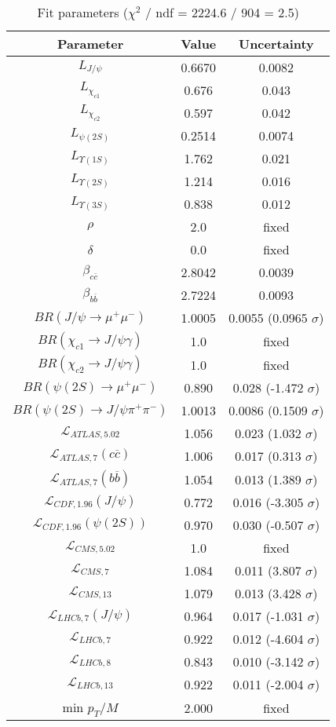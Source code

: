 \begin{table}[h!]
\centering
\begin{tabular}{c|c|c}
Parameter & Value & Uncertainty \\
\hline
$L_{J/\psi}$ & 0.6670 & 0.0082 \\
$L_{\chi_{c1}}$ & 0.676 & 0.043 \\
$L_{\chi_{c2}}$ & 0.597 & 0.042 \\
$L_{\psi(2S)}$ & 0.2514 & 0.0074 \\
$L_{\Upsilon(1S)}$ & 1.762 & 0.021 \\
$L_{\Upsilon(2S)}$ & 1.214 & 0.016 \\
$L_{\Upsilon(3S)}$ & 0.838 & 0.012 \\
$\rho$ & 2.0 & fixed \\
$\delta$ & 0.0 & fixed \\
$\beta_{c\overline c}$ & 2.8042 & 0.0039 \\
$\beta_{b\overline b}$ & 2.7224 & 0.0093 \\
$BR(J/\psi\rightarrow\mu^+\mu^-)$ & 1.0005 & 0.0055 (0.0965 $\sigma$) \\
$BR(\chi_{c1}\rightarrow J/\psi\gamma)$ & 1.0 & fixed \\
$BR(\chi_{c2}\rightarrow J/\psi\gamma)$ & 1.0 & fixed \\
$BR(\psi(2S)\rightarrow\mu^+\mu^-)$ & 0.890 & 0.028 (-1.472 $\sigma$) \\
$BR(\psi(2S)\rightarrow J/\psi\pi^+\pi^-)$ & 1.0013 & 0.0086 (0.1509 $\sigma$) \\
$\mathcal L_{ATLAS,5.02}$ & 1.056 & 0.023 (1.032 $\sigma$) \\
$\mathcal L_{ATLAS,7}(c\overline c)$ & 1.006 & 0.017 (0.313 $\sigma$) \\
$\mathcal L_{ATLAS,7}(b\overline b)$ & 1.054 & 0.013 (1.389 $\sigma$) \\
$\mathcal L_{CDF,1.96}(J/\psi)$ & 0.772 & 0.016 (-3.305 $\sigma$) \\
$\mathcal L_{CDF,1.96}(\psi(2S))$ & 0.970 & 0.030 (-0.507 $\sigma$) \\
$\mathcal L_{CMS,5.02}$ & 1.0 & fixed \\
$\mathcal L_{CMS,7}$ & 1.084 & 0.011 (3.807 $\sigma$) \\
$\mathcal L_{CMS,13}$ & 1.079 & 0.013 (3.428 $\sigma$) \\
$\mathcal L_{LHCb,7}(J/\psi)$ & 0.964 & 0.017 (-1.031 $\sigma$) \\
$\mathcal L_{LHCb,7}$ & 0.922 & 0.012 (-4.604 $\sigma$) \\
$\mathcal L_{LHCb,8}$ & 0.843 & 0.010 (-3.142 $\sigma$) \\
$\mathcal L_{LHCb,13}$ & 0.922 & 0.011 (-2.004 $\sigma$) \\
min $p_T/M$ & 2.000 & fixed \\
\end{tabular}
\caption{Fit parameters ($\chi^2$ / ndf = 2224.6 / 904 = 2.5)}
\end{table}
